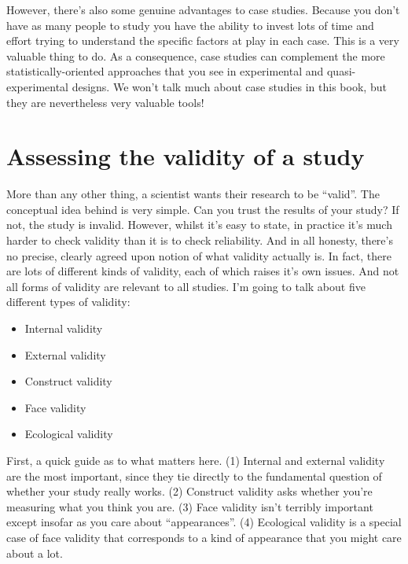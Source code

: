 However, there's also some genuine advantages to case studies. Because you don't have as many people to study you have the ability to invest lots of time and effort trying to understand the specific factors at play in each case. This is a very valuable thing to do. As a consequence, case studies can complement the more statistically-oriented approaches that you see in experimental and quasi-experimental designs. We won't talk much about case studies in this book, but they are nevertheless very valuable tools!

\section{Assessing the validity of a study~\label{sec:validity}}

More than any other thing, a scientist wants their research to be ``valid''. The conceptual idea behind  is very simple. Can you trust the results of your study? If not, the study is invalid. However, whilst it's easy to state, in practice it's much harder to check validity than it is to check reliability. And in all honesty, there's no precise, clearly agreed upon notion of what validity actually is. In fact, there are lots of different kinds of validity, each of which raises it's own issues. And not all forms of validity are relevant to all studies. I'm going to talk about five different types of validity:

\begin{itemize} \itemsep -2pt
\item Internal validity
\item External validity
\item Construct validity
\item Face validity
\item Ecological validity
\end{itemize}

First, a quick guide as to what matters here. (1) Internal and external validity are the most important, since they tie directly to the fundamental question of whether your study really works. (2) Construct validity asks whether you're measuring what you think you are. (3) Face validity isn't terribly important except insofar as you care about ``appearances''. (4) Ecological validity is a special case of face validity that corresponds to a kind of appearance that you might care about a lot.


